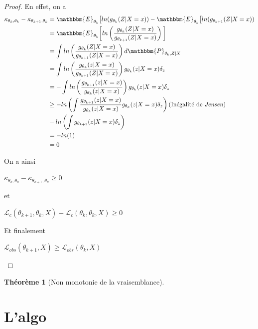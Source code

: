 \documentclass[frenchb]{report}
\newcommand{\1}{\mathbbm{1}}
\newcommand{\E}{\mathbbm{E}}
\newcommand{\prob}{\mathbbm{P}}
\newcommand{\lv}{\mathcal{L}}
\newtheorem{thm}{Théorème}
\theoremstyle{definition}\newtheorem{defn}{Définition}
\theoremstyle{definition}\newtheorem{exm}{Exemple}
\theoremstyle{definition}\newtheorem{nota}{Notation}
\theoremstyle{definition}\newtheorem{rem}{Remarque}
\begin{document}
\begin{proof}
En effet, on a
\begin{align*}
\kappa_{\theta_{k}, \theta_k}-\kappa_{\theta_{k+1}, \theta_k} &= \E_{\theta_k}\big[ln(g_{\theta_k}(Z|X=x)) - \E_{\theta_k}\big[ln(g_{\theta_{k+1}}(Z|X=x))\\
&= \E_{\theta_k}\bigg[ ln\left(\frac{g_{\theta_k}(Z|X=x)}{g_{\theta_{k+1}}(Z|X=x)}\right) \bigg]\\
&= \displaystyle\int ln\left( \frac{g_{\theta_k}(Z|X=x)}{g_{\theta_{k+1}}(Z|X=x)} \right) d\prob_{\theta_k, Z | X} \\
&= \displaystyle\int ln\left( \frac{g_{\theta_k}(z|X=x)}{g_{\theta_{k+1}}(Z|X=x)}\right) g_{\theta_k}(z|X=x)\delta_z  \\
&= - \displaystyle\int ln\left( \frac{g_{\theta_{k+1}}(z|X=x)}{g_{\theta_k}(z|X=x)}\right) g_{\theta_k}(z|X=x)\delta_z  \\
&\geq - ln\left( \displaystyle\int \frac{g_{\theta_{k+1}}(z|X=x)}{g_{\theta_k}(z|X=x)} g_{\theta_k}(z|X=x)\delta_z \right) \text{(Inégalité de \textit{Jensen})}\\
& - ln\left( \displaystyle\int g_{\theta_{k+1}}(z|X=x)\delta_z \right)\\
&= -ln(1)\\
&= 0
\end{align*}

On a ainsi

\begin{center} $\kappa_{\theta_{k}, \theta_k}-\kappa_{\theta_{k+1}, \theta_k} \geq 0$ \end{center}
et 
\begin{center} $ \lv_c(\theta_{k+1}, \theta_k, X) - \lv_c(\theta_k, \theta_k, X) \geq 0$ \end{center}

Et finalement
\begin{center} $\lv_{obs}(\theta_{k+1}, X) \geq \lv_{obs}(\theta_k, X)$ \end{center}

\end{proof}


\begin{thm}[Non monotonie de la vraisemblance]

\end{thm}

\section{L'algo}
\end{document}
